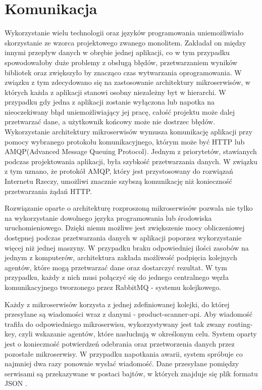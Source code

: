 \section{Komunikacja}
{Wykorzystanie wielu technologii oraz języków programowania uniemożliwiało skorzystanie ze wzorca projektowego zwanego monolitem. Zakładał on między innymi przepływ danych w obrębie jednej aplikacji, co w tym przypadku spowodowałoby duże problemy z obsługą błędów, przetwarzaniem wyników bibliotek oraz zwiększyło by znacząco czas wytwarzania oprogramowania. W związku z tym zdecydowano się na zastosowanie architektury mikroserwisów, w których każda z aplikacji stanowi osobny niezależny byt w hierarchi. W przypadku gdy jedna z aplikacji zostanie wyłączona lub napotka na nieoczekiwany błąd uniemożliwiający jej pracę, całość projektu może dalej przetwarzać dane, a użytkownik końcowy może nie dostrzec błędów. Wykorzystanie architektury mikroserwisów wymusza komunikację aplikacji przy pomocy wybranego protokołu komunikacyjnego, którym może być HTTP lub AMQP(Advanced Message Queuing Protocol)\cite{AMQP}. Jednym z priorytetów, stawianych podczas projektowania aplikacji, była szybkość przetwarzania danych. W związku z tym uznano, że protokół AMQP, który jest przystosowany do rozwiązań Internetu Rzeczy, umożliwi znacznie szybszą komunikację niż konieczność przetwarzania żądań HTTP. 
	
	
Rozwiązanie oparte o architekturę rozproszoną mikroserwisów pozwala nie tylko na wykorzystanie dowolnego języka programowania lub środowiska uruchomieniowego. Dzięki niemu możliwe jest zwiększenie mocy obliczeniowej dostępnej podczas przetwarzania danych w aplikacji poporzez wykorzystanie więcej niż jednej maszyny. W przypadku braku odpowiedniej ilości zasobów na jednym z komputerów, architektura zakłada możliwość podpięcia kolejnych agentów, które mogą przetwarzać dane oraz dostarczyć rezultat. W tym przypadku, każdy z nich musi połączyć się do jednego centralnego węzła komunikacyjnego tworzonego przez RabbitMQ \cite{RabbitMQ} - systemu kolejkowego.

Każdy z mikroserwisów korzysta z jednej zdefiniowanej kolejki, do której przesyłane są wiadomości wraz z danymi - product-scanner-api. Aby wiadomość trafiła do odpowiedniego mikroserwisu, wykorzystywany jest tak zwany routing-key, czyli wskazanie agentów, które nasłuchują w określonym celu. System oparty jest o konieczność potwierdzeń odebrania oraz przetworzenia danych przez pozostałe mikroserwisy. W przypadku napotkania awarii, system spróbuje co najmniej dwa razy ponownie wysłać wiadomość. Dane przesyłane pomiędzy serwisami są przekazywane w postaci bajtów, w których znajduje się plik formatu JSON \cite{JSON}. 
}
	
